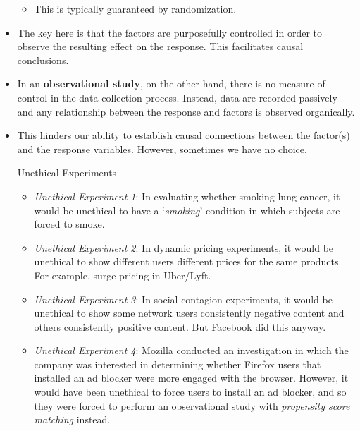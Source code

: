 \begin{itemize}
\begin{itemize}
              \item This is typically guaranteed by randomization.
          \end{itemize}
    \item The key here is that the factors are purposefully controlled in order to
          observe the resulting effect on the response. This facilitates causal conclusions.
    \item In an \textbf{observational study}, on the other hand, there is no measure of control
          in the data collection process. Instead, data are recorded passively and
          any relationship between the response and factors is observed organically.
    \item This hinders our ability to establish causal connections between the factor(s)
          and the response variables. However, sometimes we have no choice.
          \begin{Example}{Unethical Experiments}{}
              \begin{itemize}
                  \item \emph{Unethical Experiment 1}: In evaluating whether smoking lung cancer,
                        it would be unethical to have a `\emph{smoking}' condition in which subjects are
                        forced to smoke.
                  \item \emph{Unethical Experiment 2}: In dynamic pricing experiments, it would be unethical
                        to show different users different prices for the same products. For example, surge pricing
                        in Uber/Lyft.
                  \item \emph{Unethical Experiment 3}: In social contagion experiments, it would be unethical
                        to show some network users consistently negative content and others consistently positive content.
                        \href{https://slate.com/technology/2014/06/facebook-unethical-experiment-it-made-news-feeds-happier-or-sadder-to-manipulate-peoples-emotions.html}{But Facebook did this anyway.}
                  \item \emph{Unethical Experiment 4}: Mozilla conducted an investigation in which
                        the company was interested in determining whether Firefox users that installed an ad blocker
                        were more engaged with the browser. However, it would have been unethical to force users to install
                        an ad blocker, and so they were forced to perform an observational study with \emph{propensity score matching}
                        instead.
              \end{itemize}
          \end{Example}
\end{itemize}
